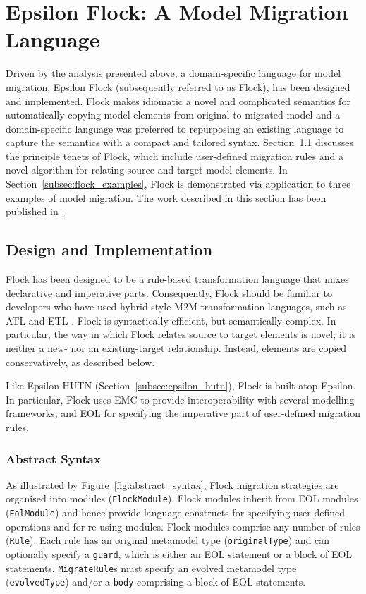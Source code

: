 
\section{Epsilon Flock: A Model Migration Language}
\label{sec:flock}
Driven by the analysis presented above, a domain-specific language for model migration, Epsilon Flock (subsequently referred to as Flock), has been designed and implemented. Flock makes idiomatic a novel and complicated semantics for automatically copying model elements from original to migrated model and a domain-specific language was preferred to repurposing an existing language to capture the semantics with a compact and tailored syntax. Section~\ref{subsec:flock_design} discusses the principle tenets of Flock, which include user-defined migration rules and a novel algorithm for relating source and target model elements. In Section~\ref{subsec:flock_examples}, Flock is demonstrated via application to three examples of model migration. The work described in this section has been published in \cite{rose10flock}.

\subsection{Design and Implementation}
\label{subsec:flock_design}
Flock has been designed to be a rule-based transformation language that mixes declarative and  imperative parts. Consequently, Flock should be familiar to developers who have used hybrid-style M2M transformation languages, such as ATL and ETL \cite{kolovos08etl}. Flock is syntactically efficient, but semantically complex. In particular, the way in which Flock relates source to target elements is novel; it is neither a new- nor an existing-target relationship. Instead, elements are copied conservatively, as described below.

Like Epsilon HUTN (Section~\ref{subsec:epsilon_hutn}), Flock is built atop Epsilon. In particular, Flock uses EMC to provide interoperability with several modelling frameworks, and EOL for specifying the imperative part of user-defined migration rules.

\subsubsection{Abstract Syntax}
\label{subsubsec:abstract_syntax}
As illustrated by Figure~\ref{fig:abstract_syntax}, Flock migration strategies are organised into modules (\texttt{Fl\-ockMo\-du\-le}). Flock modules inherit from EOL modules (\texttt{Eo\-lMod\-ule}) and hence provide language constructs for specifying user-defined operations and for re-using modules. Flock modules comprise any number of rules (\texttt{Ru\-le}). Each rule has an original metamodel type (\texttt{or\-ig\-in\-alTy\-pe}) and can optionally specify a \texttt{gu\-ard}, which is either an EOL statement or a block of EOL statements. \texttt{Mi\-gr\-ateRu\-le}s must specify an evolved metamodel type (\texttt{ev\-ol\-vedTy\-pe}) and/or a \texttt{bo\-dy} comprising a block of EOL statements.

